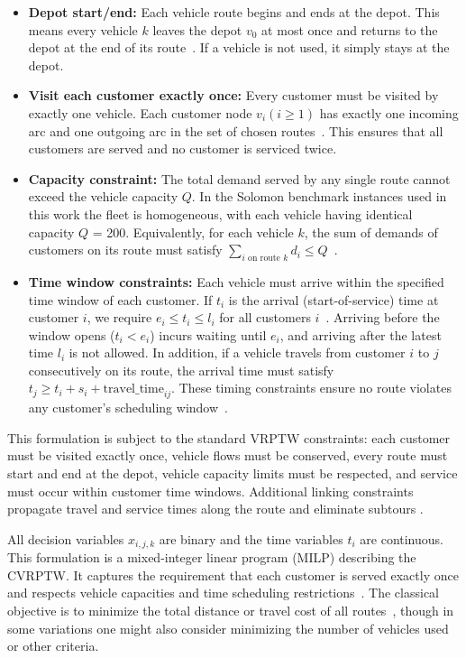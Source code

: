 \documentclass[conference]{IEEEtran}
\begin{document}
\begin{itemize}
  \item \textbf{Depot start/end:} Each vehicle route begins and ends at the depot. This means every vehicle \(k\) leaves the depot \(v_0\) at most once and returns to the depot at the end of its route~\cite{borowski2020,holliday2025}. If a vehicle is not used, it simply stays at the depot.
  \item \textbf{Visit each customer exactly once:} Every customer must be visited by exactly one vehicle. Each customer node \(v_i (i\ge 1)\) has exactly one incoming arc and one outgoing arc in the set of chosen routes~\cite{holliday2025}. This ensures that all customers are served and no customer is serviced twice.
  \item \textbf{Capacity constraint:} The total demand served by any single route cannot exceed the vehicle capacity \(Q\). In the Solomon benchmark instances used in this work the fleet is homogeneous, with each vehicle having identical capacity \(Q\) = 200. Equivalently, for each vehicle \(k\), the sum of demands of customers on its route must satisfy \(\sum_{i \text{ on route } k} d_i \le Q\)~\cite{holliday2025}.
  \item \textbf{Time window constraints:} Each vehicle must arrive within the specified time window of each customer. If \(t_i\) is the arrival (start-of-service) time at customer \(i\), we require \(e_i \le t_i \le l_i\) for all customers \(i\)~\cite{holliday2025}. Arriving before the window opens (\(t_i < e_i\)) incurs waiting until \(e_i\), and arriving after the latest time \(l_i\) is not allowed. In addition, if a vehicle travels from customer \(i\) to \(j\) consecutively on its route, the arrival time must satisfy \(t_j \ge t_i + s_i + \text{travel\_time}_{ij}\). These timing constraints ensure no route violates any customer’s scheduling window~\cite{borowski2020}.
\end{itemize}

This formulation is subject to the standard VRPTW constraints: 
each customer must be visited exactly once, vehicle flows must 
be conserved, every route must start and end at the depot, 
vehicle capacity limits must be respected, and service must occur 
within customer time windows. Additional linking constraints 
propagate travel and service times along the route and eliminate 
subtours \cite{article}.


All decision variables \(x_{i,j,k}\) are binary and the time variables \(t_i\) are continuous. This formulation is a mixed-integer linear program (MILP) describing the CVRPTW. It captures the requirement that each customer is served exactly once and respects vehicle capacities and time scheduling restrictions~\cite{holliday2025}. The classical objective is to minimize the total distance or travel cost of all routes~\cite{borowski2020}, though in some variations one might also consider minimizing the number of vehicles used or other criteria.
\end{document}

